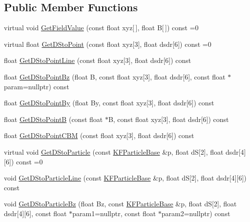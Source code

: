 \subsection*{Public Member Functions}
\begin{DoxyCompactItemize}
\item 
virtual void \hyperlink{classKFParticleBase_a54fa32dca24a267d19ac11875a650f96}{Get\+Field\+Value} (const float xyz\mbox{[}$\,$\mbox{]}, float B\mbox{[}$\,$\mbox{]}) const =0
\item 
virtual float \hyperlink{classKFParticleBase_ae4235191e7d6baaa1054507e3cb92dc9}{Get\+D\+Sto\+Point} (const float xyz\mbox{[}3\mbox{]}, float dsdr\mbox{[}6\mbox{]}) const =0
\item 
float \hyperlink{classKFParticleBase_aee9617e04925c7b26e0c9ff19c7f929e}{Get\+D\+Sto\+Point\+Line} (const float xyz\mbox{[}3\mbox{]}, float dsdr\mbox{[}6\mbox{]}) const 
\item 
float \hyperlink{classKFParticleBase_a5d8cbbe939f2be781ec24cb48f0c183f}{Get\+D\+Sto\+Point\+Bz} (float B, const float xyz\mbox{[}3\mbox{]}, float dsdr\mbox{[}6\mbox{]}, const float $\ast$param=nullptr) const 
\item 
float \hyperlink{classKFParticleBase_af9764a6d434abc765bbd3721b829f173}{Get\+D\+Sto\+Point\+By} (float By, const float xyz\mbox{[}3\mbox{]}, float dsdr\mbox{[}6\mbox{]}) const 
\item 
float \hyperlink{classKFParticleBase_a13a3715c54a4cb7b15f3f1cdfd98c8f6}{Get\+D\+Sto\+PointB} (const float $\ast$B, const float xyz\mbox{[}3\mbox{]}, float dsdr\mbox{[}6\mbox{]}) const 
\item 
float \hyperlink{classKFParticleBase_afe8330eb2ff5650fbf71c42da09cb899}{Get\+D\+Sto\+Point\+C\+BM} (const float xyz\mbox{[}3\mbox{]}, float dsdr\mbox{[}6\mbox{]}) const 
\item 
virtual void \hyperlink{classKFParticleBase_ada459a0ed2508dbc79ff582a3a32c574}{Get\+D\+Sto\+Particle} (const \hyperlink{classKFParticleBase}{K\+F\+Particle\+Base} \&p, float dS\mbox{[}2\mbox{]}, float dsdr\mbox{[}4\mbox{]}\mbox{[}6\mbox{]}) const =0
\item 
void \hyperlink{classKFParticleBase_a7d14ee08adf1bf707aa3e682f1d7b8d7}{Get\+D\+Sto\+Particle\+Line} (const \hyperlink{classKFParticleBase}{K\+F\+Particle\+Base} \&p, float dS\mbox{[}2\mbox{]}, float dsdr\mbox{[}4\mbox{]}\mbox{[}6\mbox{]}) const 
\item 
void \hyperlink{classKFParticleBase_af08e470a34c3dfd8ad208fe692a141fb}{Get\+D\+Sto\+Particle\+Bz} (float Bz, const \hyperlink{classKFParticleBase}{K\+F\+Particle\+Base} \&p, float dS\mbox{[}2\mbox{]}, float dsdr\mbox{[}4\mbox{]}\mbox{[}6\mbox{]}, const float $\ast$param1=nullptr, const float $\ast$param2=nullptr) const 

\end{DoxyCompactItemize}
